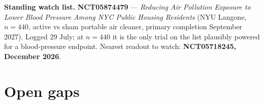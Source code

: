 \documentclass[10pt]{article}
\begin{document}
\vspace{2mm}
\textbf{Standing watch list.} \textbf{NCT05874479} --- \textit{Reducing Air Pollution
Exposure to Lower Blood Pressure Among NYC Public Housing Residents} (NYU Langone,
$n = 440$, active vs sham portable air cleaner, primary completion September 2027).
Logged 29 July; at $n = 440$ it is the only trial on the list plausibly powered for a
blood-pressure endpoint. Nearest readout to watch: \textbf{NCT05718245, December 2026}.

\clearpage

\section*{\sffamily\bfseries\color{Deep}Open gaps}
\vspace{-1.5mm}{\color{Teal}\rule{\linewidth}{1.1pt}}\vspace{2.5mm}
\end{document}
